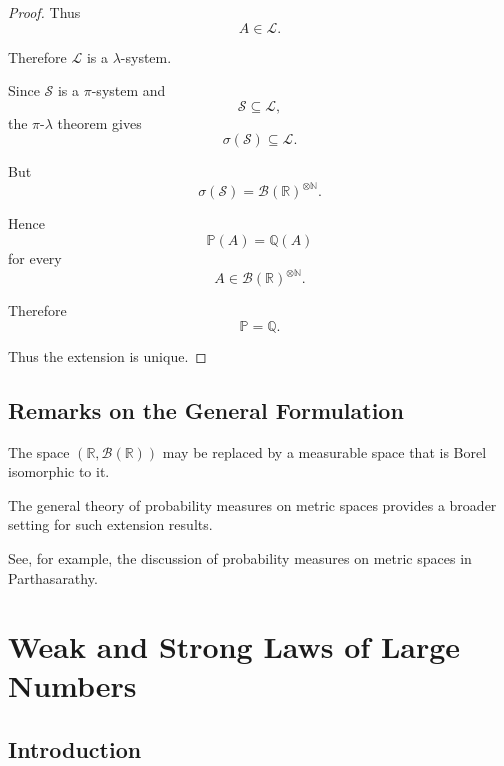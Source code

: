 \begin{proof}
Thus
\[
A\in\mathcal{L}.
\]

Therefore $\mathcal{L}$ is a $\lambda$-system.

Since $\mathcal{S}$ is a $\pi$-system and
\[
\mathcal{S}\subseteq\mathcal{L},
\]
the $\pi$-$\lambda$ theorem gives
\[
\sigma(\mathcal{S})\subseteq\mathcal{L}.
\]

But
\[
\sigma(\mathcal{S})
=
\mathcal{B}(\mathbb{R})^{\otimes\mathbb{N}}.
\]

Hence
\[
\mathbb{P}(A)=\mathbb{Q}(A)
\]
for every
\[
A\in
\mathcal{B}(\mathbb{R})^{\otimes\mathbb{N}}.
\]

Therefore
\[
\mathbb{P}=\mathbb{Q}.
\]

Thus the extension is unique.

\end{proof}



\subsection{Remarks on the General Formulation}

\begin{remark}

The space
\(
(\mathbb{R},\mathcal{B}(\mathbb{R}))
\)
may be replaced by a measurable space that is Borel isomorphic to it.

The general theory of probability measures on metric spaces provides
a broader setting for such extension results.

See, for example, the discussion of probability measures on metric
spaces in Parthasarathy.

\end{remark}



\section{Weak and Strong Laws of Large Numbers}

\subsection{Introduction}

